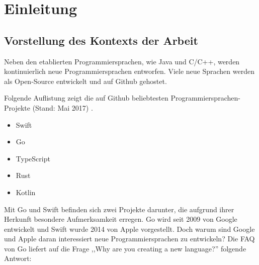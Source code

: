 \chapter{Einleitung}

\section{Vorstellung des Kontexts der Arbeit}
Neben den etablierten Programmiersprachen, wie Java und C/C++, werden kontinuierlich neue Programmiersprachen entworfen.
Viele neue Sprachen werden als Open-Source entwickelt und auf Github gehostet.

Folgende Auflistung zeigt die auf Github beliebtesten Programmiersprachen-Projekte (Stand: Mai 2017) \cite{Github}.


\begin{itemize}
    \item Swift
    \item Go
    \item TypeScript
    \item Rust
    \item Kotlin
\end{itemize}

Mit Go und Swift befinden sich zwei Projekte darunter, die aufgrund ihrer Herkunft besondere Aufmerksamkeit erregen.
Go wird seit 2009 von Google entwickelt und Swift wurde 2014 von Apple vorgestellt.
Doch warum sind Google und Apple daran interessiert neue Programmiersprachen zu entwickeln?
Die \gls{FAQ} von Go liefert auf die Frage ,,Why are you creating a new language?'' folgende Antwort: 

